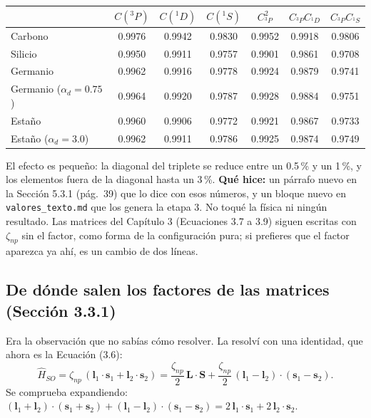 \documentclass[11pt,a4paper]{article}
\newcommand{\arch}[1]{\texttt{\small #1}}
\begin{document}
\begin{center}
\begin{tabular}{lcccccc}
\toprule
 & $C(^3P)$ & $C(^1D)$ & $C(^1S)$ & $C_{^3P}^2$ & $C_{^3P}C_{^1D}$ & $C_{^3P}C_{^1S}$\\
\midrule
Carbono & 0.9976 & 0.9942 & 0.9830 & 0.9952 & 0.9918 & 0.9806\\
Silicio & 0.9950 & 0.9911 & 0.9757 & 0.9901 & 0.9861 & 0.9708\\
Germanio & 0.9962 & 0.9916 & 0.9778 & 0.9924 & 0.9879 & 0.9741\\
Germanio ($\alpha_d=0.75$) & 0.9964 & 0.9920 & 0.9787 & 0.9928 & 0.9884 & 0.9751\\
Estaño & 0.9960 & 0.9906 & 0.9772 & 0.9921 & 0.9867 & 0.9733\\
Estaño ($\alpha_d=3.0$) & 0.9962 & 0.9911 & 0.9786 & 0.9925 & 0.9874 & 0.9749\\
\bottomrule
\end{tabular}
\end{center}

El efecto es pequeño: la diagonal del triplete se reduce entre un 0.5\,\% y un 1\,\%, y los
elementos fuera de la diagonal hasta un 3\,\%. \textbf{Qué hice:} un párrafo nuevo en la
Sección 5.3.1 (pág.~39) que lo dice con esos números, y un bloque nuevo en
\arch{valores\_texto.md} que los genera la etapa 3. No toqué la física ni ningún resultado. Las
matrices del Capítulo 3 (Ecuaciones 3.7 a 3.9) siguen escritas con $\zeta_{np}$ sin el factor,
como forma de la configuración pura; si prefieres que el factor aparezca ya ahí, es un cambio de
dos líneas.

\subsection{De dónde salen los factores de las matrices (Sección 3.3.1)}

Era la observación que no sabías cómo resolver. La resolví con una identidad, que ahora es la
Ecuación (3.6):
\[
\hat H_{SO}=\zeta_{np}\,(\mathbf l_1\!\cdot\!\mathbf s_1+\mathbf l_2\!\cdot\!\mathbf s_2)
=\frac{\zeta_{np}}{2}\,\mathbf L\!\cdot\!\mathbf S
+\frac{\zeta_{np}}{2}\,(\mathbf l_1-\mathbf l_2)\!\cdot\!(\mathbf s_1-\mathbf s_2).
\]
Se comprueba expandiendo: $(\mathbf l_1+\mathbf l_2)\cdot(\mathbf s_1+\mathbf s_2)+(\mathbf
l_1-\mathbf l_2)\cdot(\mathbf s_1-\mathbf s_2)=2\,\mathbf l_1\!\cdot\!\mathbf s_1+2\,\mathbf
l_2\!\cdot\!\mathbf s_2$.
\end{document}
